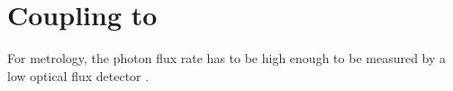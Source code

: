 

\section[VCSELs]{Coupling \Nds to \Vcsels} \label{sec::coupling_vcsel}

For metrology, the photon flux rate has to be high enough to be measured by a low optical flux detector \cite{Vaigu2017}.

